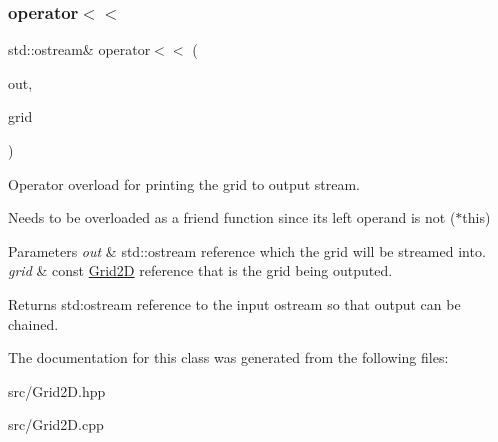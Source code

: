 \subsubsection{\texorpdfstring{operator$<$$<$}{operator<<}}
{\footnotesize\ttfamily std\+::ostream\& operator$<$$<$ (\begin{DoxyParamCaption}\item[{std\+::ostream \&}]{out,  }\item[{const \hyperlink{class_grid2_d}{Grid2D} \&}]{grid }\end{DoxyParamCaption})\hspace{0.3cm}{\ttfamily [friend]}}



Operator overload for printing the grid to output stream. 

Needs to be overloaded as a friend function since its left operand is not ($\ast$this)


\begin{DoxyParams}{Parameters}
{\em out} & std\+::ostream reference which the grid will be streamed into.\\
\hline
{\em grid} & const \hyperlink{class_grid2_d}{Grid2D} reference that is the grid being outputed.\\
\hline
\end{DoxyParams}
\begin{DoxyReturn}{Returns}
std\+:ostream reference to the input ostream so that output can be chained. 
\end{DoxyReturn}


The documentation for this class was generated from the following files\+:\begin{DoxyCompactItemize}
\item 
src/Grid2\+D.\+hpp\item 
src/Grid2\+D.\+cpp\end{DoxyCompactItemize}
